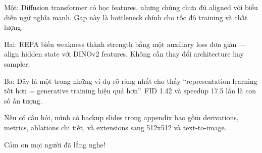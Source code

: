 \begin{frame}[t]
{    Một: Diffusion transformer có học features, nhưng chúng chưa đủ
    aligned với biểu diễn ngữ nghĩa mạnh. Gap này là bottleneck
    chính cho tốc độ training và chất lượng.

    Hai: REPA biến weakness thành strength bằng một auxiliary loss
    đơn giản — align hidden state với DINOv2 features. Không cần
    thay đổi architecture hay sampler.

    Ba: Đây là một trong những ví dụ rõ ràng nhất cho thấy
    ``representation learning tốt hơn = generative training hiệu
    quả hơn''. FID 1.42 và speedup 17.5 lần là con số ấn tượng.

    Nếu có câu hỏi, mình có backup slides trong appendix bao gồm
    derivations, metrics, ablations chi tiết, và extensions sang
    512x512 và text-to-image.

    Cảm ơn mọi người đã lắng nghe!
  }
\end{frame}
